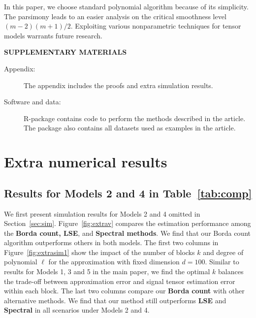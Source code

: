 \documentclass[12pt]{article}
\theoremstyle{definition}
\begin{document}
In this paper, we choose standard polynomial algorithm because of its simplicity. The parsimony leads to an easier analysis on the critical smoothness level $ (m-2)(m+1)/2$. Exploiting various nonparametric techniques for tensor models warrants future research.





\clearpage
\bigskip
\begin{center}
{\large\bf SUPPLEMENTARY MATERIALS}
\end{center}

\begin{description}

\item[Appendix:] The appendix includes the proofs and extra simulation results. 

\item[Software and data:] R-package contains code to perform the methods described in the article. The package also contains all datasets used as examples in the article.
\end{description}

\appendix


\renewcommand{\thefigure}{S\arabic{figure}}
\setcounter{figure}{0}   
\renewcommand{\thetable}{S\arabic{table}}
\setcounter{table}{0}   

\section{Extra numerical results}\label{app:extra}
\subsection{Results for Models 2 and 4 in Table~\ref{tab:comp}}\label{sec:extra}
We first present simulation results for Models 2 and 4 omitted in Section~\ref{sec:sim}. Figure~\ref{fig:extrav} compares the estimation performance among the {\bf \small Borda count, LSE}, and {\bf \small Spectral methods}. We find that our Borda count algorithm outperforms others in both models. The first two columns in Figure~\ref{fig:extrasim1} show the impact of the number of blocks $k$ and degree of polynomial $\ell$ for the approximation with fixed dimension $d = 100$. Similar to results for Models 1, 3 and 5 in the main paper, we find the optimal $k$ balances the trade-off between approximation error and signal tensor estimation error within each block. The last two columns compare our {\bf \small Borda count} with other alternative methods. We find that our method still outperforms {\bf \small LSE} and {\bf \small Spectral} in all scenarios under Models 2 and 4.
\end{document}
